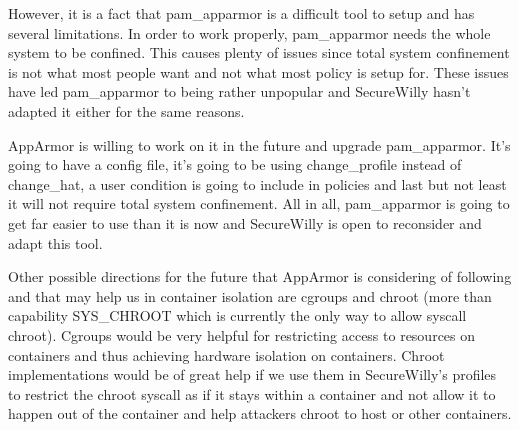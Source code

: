 However, it is a fact that pam\_apparmor is a difficult tool to setup and has several limitations. In order to work properly, pam\_apparmor needs the whole system to be confined. This causes plenty of issues since total system confinement is not what most people want and not what most policy is setup for. These issues have led pam\_apparmor to being rather unpopular and SecureWilly hasn't adapted it either for the same reasons.

AppArmor is willing to work on it in the future and upgrade pam\_apparmor. It's going to have a config file, it's going to be using change\_profile instead of change\_hat, a user condition is going to include in policies and last but not least it will not require total system confinement. All in all, pam\_apparmor is going to get far easier to use than it is now and SecureWilly is open to reconsider and adapt this tool.

Other possible directions for the future that AppArmor is considering of following and that may help us in container isolation are cgroups and chroot (more than capability SYS\_CHROOT which is currently the only way to allow syscall chroot). Cgroups would be very helpful for restricting access to resources on containers and thus achieving hardware isolation on containers. Chroot implementations would be of great help if we use them in SecureWilly's profiles to restrict the chroot syscall as if it stays within a container and not allow it to happen out of the container and help attackers chroot to host or other containers.

